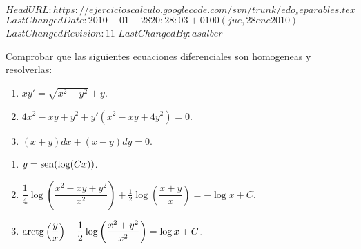 \svnidlong
{$HeadURL: https://ejercicioscalculo.googlecode.com/svn/trunk/edo_separables.tex $}
{$LastChangedDate: 2010-01-28 20:28:03 +0100 (jue, 28 ene 2010) $}
{$LastChangedRevision: 11 $}
{$LastChangedBy: asalber $}
%
{Comprobar que las siguientes ecuaciones diferenciales son homogeneas y resolverlas:
\begin{enumerate}
\item $xy'=\sqrt{x^2-y^2}+y$.
\item $4x^2−xy+y^2+y'(x^2−xy+4y^2)=0$.
\item $(x+y)dx + (x-y)dy = 0$.
\end{enumerate}
}
{
\begin{enumerate}
\item $y=\operatorname{sen}(\log(Cx))$.
\item $\dfrac{1}{4}\log\left(\dfrac{x^2-xy+y^2}{x^2}\right)+\frac{1}{2}\log\left(\dfrac{x+y}{x}\right)=-\log x +C$.
\item $\operatorname{arctg}\left(\dfrac{y}{x}\right)-\dfrac{1}{2}\log\left(\dfrac{x^2+y^2}{x^2}\right)=\log x + C$. 
\end{enumerate}
}
{}
